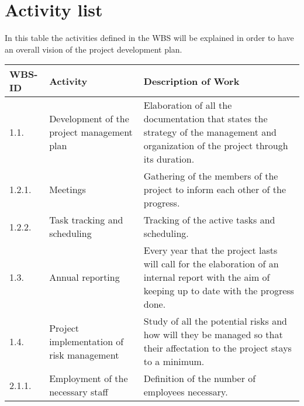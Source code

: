 \section{Activity list}
In this table the activities defined in the WBS will be explained in order to have an overall vision of the project development plan. 

\begin{longtable}[H]{l >{\raggedright\arraybackslash}p{4cm} p{8cm}}
	
	\toprule[2pt]
	
	\textbf{WBS-ID} &  \textbf{Activity}  & \textbf{Description of Work} \\
	
	\midrule [1.5pt]
	\endhead
	
	1.1. & Development of the project management plan &Elaboration of all the documentation that states the strategy of the management and organization of the project through its duration.\vspace{0.2cm} \\
	
	\midrule
	
	1.2.1. & Meetings & Gathering of the members of the project to inform each other of the progress.\vspace{0.2cm} \\
	
	\midrule
	
	1.2.2. & Task tracking and scheduling & Tracking of the active tasks and scheduling.\vspace{0.2cm} \\
	
	\midrule
	
	1.3. & Annual reporting & Every year that the project lasts will call for the elaboration of an internal report with the aim of keeping up to date with the progress done.\vspace{0.2cm} \\
	
	\midrule
	
	1.4. & Project implementation of risk management & Study of all the potential risks and how will they be managed so that their affectation to the project stays to a minimum.\vspace{0.2cm} \\
	
	\midrule
	
	2.1.1. & Employment of the necessary staff & Definition of the number of employees necessary.\vspace{0.2cm} \\
	

\end{longtable}
